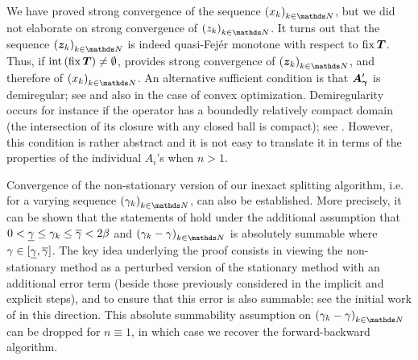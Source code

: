 \begin{remark}
\label{rem:strong}
We have proved strong convergence of the sequence $\pa{x_k}_{k \in \N}$, but we did not elaborate on strong convergence of $\pa{z_k}_{k \in \N}$. It turns out that the sequence $\pa{\bz_k}_{k \in \N}$ is indeed quasi-Fej\'er monotone with respect to $\operatorname{fix} \boldsymbol T$. Thus, if $\operatorname{int} \left( \operatorname{fix} \boldsymbol T \right) \neq \emptyset$, \cite[Lemma~2.8(iv)]{Combettes04} provides strong convergence of $\pa{\bz_k}_{k \in \N}$, and therefore of $\pa{x_k}_{k \in \N}$. An alternative sufficient condition is that $\boldsymbol A_{\boldsymbol{\gamma}}^{\prime}$ is demiregular; see \cite[Definition~2.3]{Attouch10} and also \cite[Condition~3.2]{CombettesWajs05} in the case of convex optimization. Demiregularity occurs for instance if the operator has a boundedly relatively compact domain (the intersection of its closure with any closed ball is compact); see \cite[Proposition 2.4]{Attouch10}. However, this condition is rather abstract and it is not easy to translate it in terms of the properties of the individual $A_i$'s when $n > 1$.
\end{remark} 

\begin{remark}
\label{rem:nonstat}
Convergence of the non-stationary version of our inexact \GFB splitting algorithm, i.e. for a varying sequence $\pa{\ga_k}_{k \in \N}$, can also be established. More precisely, it can be shown that the statements of  hold under the additional assumption that $0 < \underline{\gamma} \leq \gamma_k \leq \overline{\gamma} < 2\beta$ and $\pa{\ga_k-\ga}_{k \in \N}$ is absolutely summable where $\gamma \in [\underline{\gamma},\overline{\gamma}]$. The key idea underlying the proof consists in viewing the non-stationary method as a perturbed version of the stationary method with an additional error term (beside those previously considered in the implicit and explicit steps), and to ensure that this error is also summable; see the initial work of \cite{Lemaire96a,Lemaire96b} in this direction. This absolute summability assumption on $\pa{\ga_k-\ga}_{k \in \N}$ can be dropped for $n \equiv 1$, in which case we recover the forward-backward algorithm.
\end{remark} 

